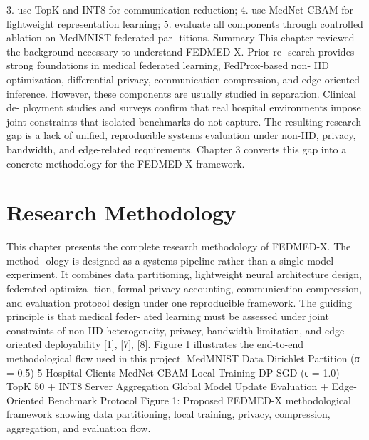 3. use TopK and INT8 for communication reduction; 4. use MedNet-CBAM for lightweight representation learning; 5. evaluate all components through controlled ablation on MedMNIST federated par- titions.
Summary
This chapter reviewed the background necessary to understand FEDMED-X. Prior re- search provides strong foundations in medical federated learning, FedProx-based non-
IID optimization, differential privacy, communication compression, and edge-oriented inference. However, these components are usually studied in separation. Clinical de- ployment studies and surveys confirm that real hospital environments impose joint constraints that isolated benchmarks do not capture. The resulting research gap is a lack of unified, reproducible systems evaluation under non-IID, privacy, bandwidth, and edge-related requirements. Chapter 3 converts this gap into a concrete methodology for the FEDMED-X framework.

\chapter{Research Methodology}
This chapter presents the complete research methodology of FEDMED-X. The method- ology is designed as a systems pipeline rather than a single-model experiment.
It combines data partitioning, lightweight neural architecture design, federated optimiza- tion, formal privacy accounting, communication compression, and evaluation protocol design under one reproducible framework. The guiding principle is that medical feder- ated learning must be assessed under joint constraints of non-IID heterogeneity, privacy, bandwidth limitation, and edge-oriented deployability [1], [7], [8].
Figure 1 illustrates the end-to-end methodological flow used in this project.
MedMNIST
Data
Dirichlet
Partition (α = 0.5) 5 Hospital
Clients
MedNet-CBAM
Local Training
DP-SGD (ϵ = 1.0)
TopK 50%
+ INT8
Server
Aggregation
Global Model
Update
Evaluation + Edge-Oriented
Benchmark Protocol
Figure 1: Proposed FEDMED-X methodological framework showing data partitioning, local training, privacy, compression, aggregation, and evaluation flow.

